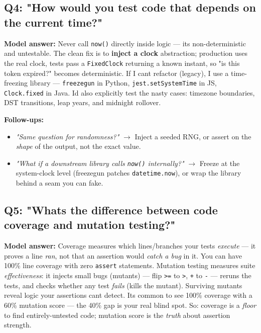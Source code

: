 \documentclass[11pt]{article}
\providecommand{\tightlist}{\setlength{\itemsep}{1pt}\setlength{\parskip}{0pt}}
\begin{document}
\subsection{Q4: "How would you test code that depends on the current time?"}\label{q4-how-would-you-test-code-that-depends-on-the-current-time}

\textbf{Model answer:} Never call \texttt{now()} directly inside logic --- it\textquotesingle s non-deterministic and untestable. The clean fix is to \textbf{inject a clock} abstraction; production uses the real clock, tests pass a \texttt{FixedClock} returning a known instant, so "is this token expired?" becomes deterministic. If I can\textquotesingle t refactor (legacy), I use a time-freezing library --- \texttt{freezegun} in Python, \texttt{jest.setSystemTime} in JS, \texttt{Clock.fixed} in Java. I\textquotesingle d also explicitly test the nasty cases: timezone boundaries, DST transitions, leap years, and midnight rollover.

\textbf{Follow-ups:}

\begin{itemize}
\tightlist
\item
  \emph{"Same question for randomness?"} \(\rightarrow\) Inject a seeded RNG, or assert on the \emph{shape} of the output, not the exact value.
\item
  \emph{"What if a downstream library calls \texttt{now()} internally?"} \(\rightarrow\) Freeze at the system-clock level (freezegun patches \texttt{datetime.now}), or wrap the library behind a seam you can fake.
\end{itemize}

\subsection{Q5: "What\textquotesingle s the difference between code coverage and mutation testing?"}\label{q5-whats-the-difference-between-code-coverage-and-mutation-testing}

\textbf{Model answer:} Coverage measures which lines/branches your tests \emph{execute} --- it proves a line \emph{ran}, not that an assertion would \emph{catch a bug} in it. You can have 100\% line coverage with zero \texttt{assert} statements. Mutation testing measures suite \emph{effectiveness}: it injects small bugs (mutants) --- flip \texttt{\textgreater{}=} to \texttt{\textgreater{}}, \texttt{+} to \texttt{-} --- reruns the tests, and checks whether any test \emph{fails} (kills the mutant). Surviving mutants reveal logic your assertions can\textquotesingle t detect. It\textquotesingle s common to see 100\% coverage with a 60\% mutation score --- the 40\% gap is your real blind spot. So: coverage is a \emph{floor} to find entirely-untested code; mutation score is the \emph{truth} about assertion strength.
\end{document}
